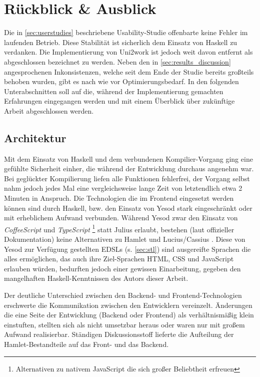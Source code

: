 \documentclass[11pt,a4paper,twoside,ngerman]{article}
\begin{document}
\clearpage
\section{Rückblick \& Ausblick} \label{sec:future_work}
Die in \autoref{sec:userstudies} beschriebene Usability-Studie offenbarte keine Fehler im laufenden Betrieb. Diese Stabilität ist sicherlich dem Einsatz von Haskell zu verdanken. Die Implementierung von Uni2work ist jedoch weit davon entfernt als abgeschlossen bezeichnet zu werden. Neben den in \autoref{sec:results_discussion} angesprochenen Inkonsistenzen, welche seit dem Ende der Studie bereits großteils behoben wurden, gibt es nach wie vor Optimierungsbedarf. In den folgenden Unterabschnitten soll auf die, während der Implementierung gemachten Erfahrungen eingegangen werden und mit einem Überblick über zukünftige Arbeit abgeschlossen werden.

\subsection{Architektur}
Mit dem Einsatz von Haskell und dem verbundenen Kompilier-Vorgang ging eine gefühlte Sicherheit einher, die während der Entwicklung durchaus angenehm war. Bei geglückter Kompilierung liefen alle Funktionen fehlerfrei, der Vorgang selbst nahm jedoch jedes Mal eine vergleichsweise lange Zeit von letztendlich etwa 2 Minuten in Anspruch. Die Technologien die im Frontend eingesetzt werden können sind durch Haskell, bzw. den Einsatz von Yesod stark eingeschränkt oder mit erheblichem Aufwand verbunden. Während Yesod zwar den Einsatz von \textit{CoffeeScript} und \textit{TypeScript} \footnote{Alternativen zu nativem JavaScript die sich großer Beliebtheit erfreuen} statt Julius erlaubt, bestehen (laut offizieller Dokumentation) keine Alternativen zu Hamlet und Lucius/Cassius \cite{web:yesodstl}. Diese von Yesod zur Verfügung gestellten EDSLs (s. \autoref{sec:stl}) sind ausgereifte Sprachen die alles ermöglichen, das auch ihre Ziel-Sprachen HTML, CSS und JavaScript erlauben würden, bedurften jedoch einer gewissen Einarbeitung, gegeben den mangelhaften Haskell-Kenntnissen des Autors dieser Arbeit.

Der deutliche Unterschied zwischen den Backend- und Frontend-Technologien erschwerte die Kommunikation zwischen den Entwicklern vereinzelt. Änderungen die eine Seite der Entwicklung (Backend oder Frontend) als verhältnismäßig klein einstuften, stellten sich als nicht umsetzbar heraus oder waren nur mit großem Aufwand realisierbar. Ständigen Diskussionsstoff lieferte die Aufteilung der Hamlet-Bestandteile auf das Front- und das Backend.
\end{document}
